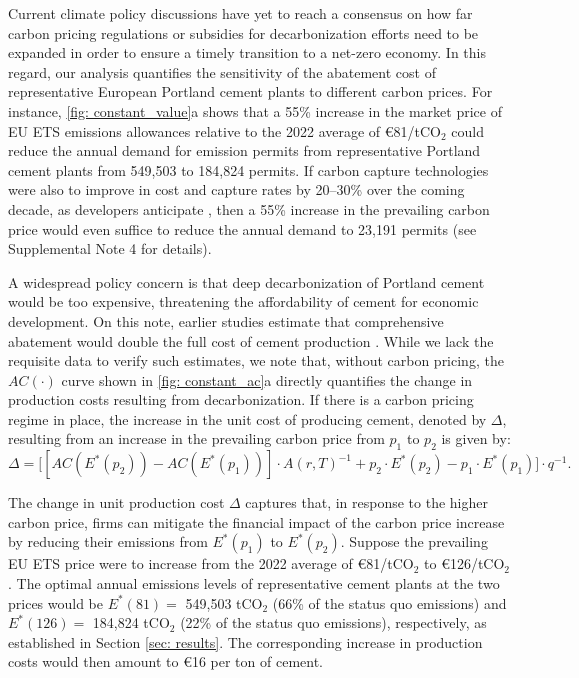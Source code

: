 \documentclass[12pt, a4paper]{article} %
\newcommand{\Suppl}{Supplemental}
\begin{document}
Current climate policy discussions have yet to reach a consensus on how far carbon pricing regulations or subsidies for decarbonization efforts need to be expanded in order to ensure a timely transition to a net-zero economy. In this regard, our analysis quantifies the sensitivity of the abatement cost of representative European Portland cement plants to different carbon prices. For instance, \autoref{fig: constant_value}a shows that a 55\% increase in the market price of EU ETS emissions allowances relative to the 2022 average of \euro 81/tCO$_2$ could reduce the annual demand for emission permits from representative Portland cement plants from 549,503 to 184,824 permits. If carbon capture technologies were also to improve in cost and capture rates by 20--30\% over the coming decade, as developers anticipate \citep{kearns2021technology}, then a 55\% increase in the prevailing carbon price would even suffice to reduce the annual demand to 23,191 permits (see \Suppl$ $ Note 4 for details).

A widespread policy concern is that deep decarbonization of Portland cement would be too expensive, threatening the affordability of cement for economic development. On this note, earlier studies estimate that comprehensive abatement would double the full cost of cement production \citep{fennell2022going}. While we lack the requisite data to verify such estimates, we note that, without carbon pricing, the $AC(\cdot)$ curve shown in \autoref{fig: constant_ac}a directly quantifies the change in production costs resulting from decarbonization. If there is a carbon pricing regime in place, the increase in the unit cost of producing cement, denoted by $\Delta$, resulting from an increase in the prevailing carbon price from $p_1$ to $p_2$ is given by:
\begin{equation}
\Delta = \bigl[[AC(E^*(p_2)) - AC(E^*(p_1))] \cdot A(r,T)^{-1} + p_2 \cdot E^*(p_2) - p_1 \cdot E^*(p_1)\bigr] \cdot q^{-1}.
\end{equation}

The change in unit production cost $\Delta$ captures that, in response to the higher carbon price, firms can mitigate the financial impact of the carbon price increase by reducing their emissions from $E^*(p_1)$ to $E^*(p_2)$. Suppose the prevailing EU ETS price were to increase from the 2022 average of \euro 81/tCO$_2$ to \euro 126/tCO$_2$. The optimal annual emissions levels of representative cement plants at the two prices would be $E^*(81)=$ 549,503 tCO$_2$ (66\% of the status quo emissions) and $E^*(126)=$ 184,824 tCO$_2$ (22\% of the status quo emissions), respectively, as established in Section \ref{sec: results}. The corresponding increase in production costs would then amount to \euro 16 per ton of cement.
\end{document}
